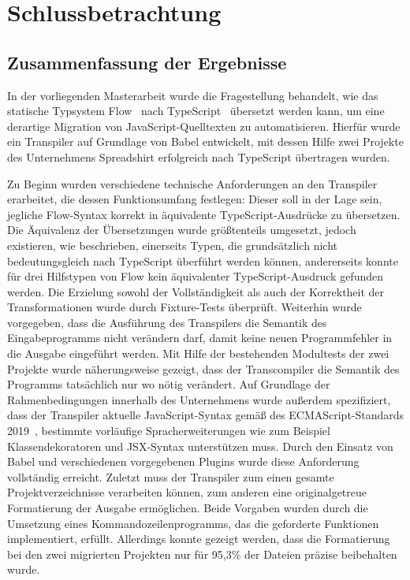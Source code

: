 \chapter{Schlussbetrachtung}
\label{chap:conclusion}

\section{Zusammenfassung der Ergebnisse}

In der vorliegenden Masterarbeit wurde die Fragestellung behandelt, wie das statische Typsystem Flow~\autocite{FLOW:PAPER} nach TypeScript~\autocite{TYPESCRIPT:SPEC} übersetzt werden kann, um eine derartige Migration von JavaScript-Quelltexten zu automatisieren. Hierfür wurde ein Transpiler auf Grundlage von Babel entwickelt, mit dessen Hilfe zwei Projekte des Unternehmens Spreadshirt erfolgreich nach TypeScript übertragen wurden.

Zu Beginn wurden verschiedene technische Anforderungen an den Transpiler erarbeitet, die dessen Funktionsumfang festlegen:
Dieser soll in der Lage sein, jegliche Flow-Syntax korrekt in äquivalente TypeScript-Ausdrücke zu übersetzen. Die Äquivalenz der Übersetzungen wurde größtenteils umgesetzt, jedoch existieren, wie beschrieben, einerseits Typen, die grundsätzlich nicht bedeutungsgleich nach TypeScript überführt werden können, andererseits konnte für drei Hilfstypen von Flow kein äquivalenter TypeScript-Ausdruck gefunden werden. Die Erzielung sowohl der Vollständigkeit als auch der Korrektheit der Transformationen wurde durch Fixture-Tests überprüft.
Weiterhin wurde vorgegeben, dass die Ausführung des Transpilers die Semantik des Eingabeprogramms nicht verändern darf, damit keine neuen Programmfehler in die Ausgabe eingeführt werden. Mit Hilfe der bestehenden Modultests der zwei Projekte wurde näherungsweise gezeigt, dass der Transcompiler die Semantik des Programms tatsächlich nur wo nötig verändert.
Auf Grundlage der Rahmenbedingungen innerhalb des Unternehmens wurde außerdem spezifiziert, dass der Transpiler aktuelle JavaScript-Syntax gemäß des ECMAScript-Standards 2019~\autocite{ECMASCRIPT:2019}, bestimmte vorläufige Spracherweiterungen wie zum Beispiel Klassendekoratoren und JSX-Syntax unterstützen muss. Durch den Einsatz von Babel und verschiedenen vorgegebenen Plugins wurde diese Anforderung vollständig erreicht.
Zuletzt muss der Transpiler zum einen gesamte Projektverzeichnisse verarbeiten können, zum anderen eine originalgetreue Formatierung der Ausgabe ermöglichen. Beide Vorgaben wurden durch die Umsetzung eines Kommandozeilenprogramms, das die geforderte Funktionen implementiert, erfüllt. Allerdings konnte gezeigt werden, dass die Formatierung bei den zwei migrierten Projekten nur für 95,3\% der Dateien präzise beibehalten wurde.


